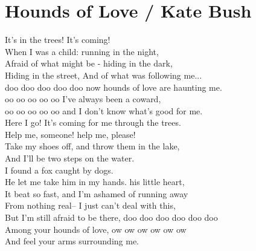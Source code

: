 \section{Hounds of Love / Kate Bush}\label{sec:hounds_of_love}
  
  \Fmajor
  \Cmajor
  \BflatMajor
  \Aminor
  \DminorSeven
  
  It's in the trees!
  It's coming!\\
  When I was a child:
  running in the night,\\
  Afraid of what might be -
  hiding in the dark,\\
  Hiding in the street,
  And of what was following me...\\
  doo doo doo doo doo
  now hounds of love are haunting me. \\
  oo oo oo oo oo 
  I've always been a coward,\\
  oo oo oo oo oo 
  and I don't know what's good for me.\\
  Here I go!
  It's coming for me through the trees.\\
  Help me, someone!
  help me, please!\\
  Take my shoes off,
  and throw them in the lake,\\
  And I'll be
  two steps on the water.\\
  I found a fox
  caught by dogs.\\
  He let me take him in my hands.
  his little heart,\\
  It beat so fast,
  and I'm ashamed of running away\\
  From nothing real--
  I just can't deal with this,\\
  But I'm still afraid to be there,
  doo doo doo doo doo doo\\
  Among your hounds of love,
  ow ow ow ow ow ow\\
  And feel your arms surrounding me.
